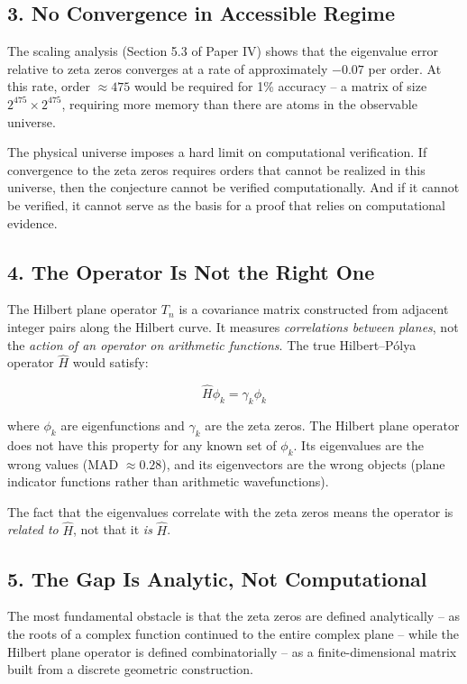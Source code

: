 \documentclass[11pt,a4paper]{article}
\begin{document}
\subsection{3. No Convergence in Accessible Regime}

The scaling analysis (Section 5.3 of Paper IV) shows that the eigenvalue
error relative to zeta zeros converges at a rate of approximately $-0.07$
per order.  At this rate, order $\approx 475$ would be required for 1\%
accuracy -- a matrix of size $2^{475} \times 2^{475}$, requiring more
memory than there are atoms in the observable universe.

The physical universe imposes a hard limit on computational verification.
If convergence to the zeta zeros requires orders that cannot be realized
in this universe, then the conjecture cannot be verified computationally.
And if it cannot be verified, it cannot serve as the basis for a proof
that relies on computational evidence.

\subsection{4. The Operator Is Not the Right One}

The Hilbert plane operator $T_n$ is a covariance matrix constructed from
adjacent integer pairs along the Hilbert curve.  It measures
\emph{correlations between planes}, not the \emph{action of an operator
on arithmetic functions}.  The true Hilbert--P\'{o}lya operator $\hat{H}$
would satisfy:

\begin{equation}
\hat{H} \phi_k = \gamma_k \phi_k
\end{equation}

where $\phi_k$ are eigenfunctions and $\gamma_k$ are the zeta zeros.
The Hilbert plane operator does not have this property for any known
set of $\phi_k$.  Its eigenvalues are the wrong values (MAD $\approx
0.28$), and its eigenvectors are the wrong objects (plane indicator
functions rather than arithmetic wavefunctions).

The fact that the eigenvalues correlate with the zeta zeros means the
operator is \emph{related to} $\hat{H}$, not that it \emph{is} $\hat{H}$.

\subsection{5. The Gap Is Analytic, Not Computational}

The most fundamental obstacle is that the zeta zeros are defined
analytically -- as the roots of a complex function continued to the
entire complex plane -- while the Hilbert plane operator is defined
combinatorially -- as a finite-dimensional matrix built from a
discrete geometric construction.
\end{document}
